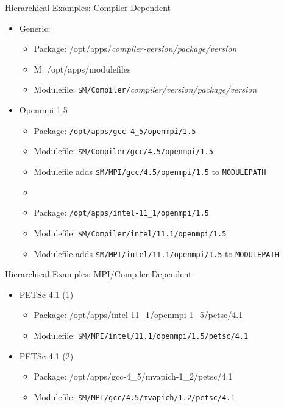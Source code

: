 \documentclass{beamer}
\begin{document}
\begin{frame}{Hierarchical Examples: Compiler Dependent}
  \begin{itemize}
    \item Generic:
      \begin{itemize}
        \item Package: /opt/apps/\emph{compiler-version/package/version}
        \item M: /opt/apps/modulefiles
        \item Modulefile: \texttt{\$M/Compiler/}\emph{compiler/version/package/version}
      \end{itemize}
    \item Openmpi 1.5
      \begin{itemize}
        \item Package: \texttt{/opt/apps/gcc-4\_5/openmpi/1.5}
        \item Modulefile: \texttt{\$M/Compiler/gcc/4.5/openmpi/1.5}
        \item Modulefile adds \texttt{\$M/MPI/gcc/4.5/openmpi/1.5}
          to \texttt{MODULEPATH}
        \item
        \item Package: \texttt{/opt/apps/intel-11\_1/openmpi/1.5}
        \item Modulefile: \texttt{\$M/Compiler/intel/11.1/openmpi/1.5}
        \item Modulefile adds \texttt{\$M/MPI/intel/11.1/openmpi/1.5}
          to \texttt{MODULEPATH}
          
      \end{itemize}
  \end{itemize}
\end{frame}

\begin{frame}{Hierarchical Examples: MPI/Compiler Dependent}
  \begin{itemize}
    \item PETSc 4.1 (1)
      \begin{itemize}
        \item Package: /opt/apps/intel-11\_1/openmpi-1\_5/petsc/4.1
        \item Modulefile: \texttt{\$M/MPI/intel/11.1/openmpi/1.5/petsc/4.1}
      \end{itemize}
    \item PETSc 4.1 (2)
      \begin{itemize}
        \item Package: /opt/apps/gcc-4\_5/mvapich-1\_2/petsc/4.1
        \item Modulefile: \texttt{\$M/MPI/gcc/4.5/mvapich/1.2/petsc/4.1}
      \end{itemize}
  \end{itemize}
\end{frame}
\end{document}
